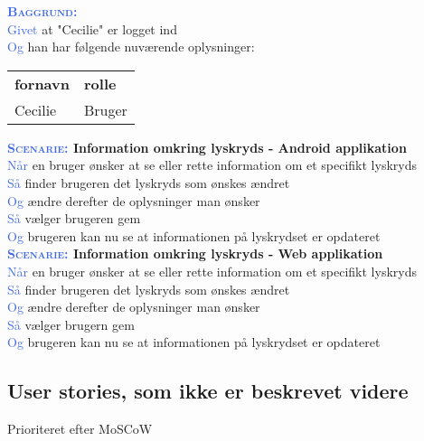 \textsc{\textcolor{RoyalBlue}{\textbf{Baggrund:}}}\\
\textcolor{RoyalBlue}{Givet} at "Cecilie" er logget ind\\
\textcolor{RoyalBlue}{Og} han har følgende nuværende oplysninger:\\
\begin{tabular}{| l | l |}
	\textbf{fornavn} & \textbf{rolle} \\
	Cecilie & Bruger\\
\end{tabular}
\newline \newline

\textbf{\textsc{\textcolor{RoyalBlue}{Scenarie:}} Information omkring lyskryds - Android applikation}\\
\textcolor{RoyalBlue}{Når} en bruger ønsker at se eller rette information om et specifikt lyskryds\\
\textcolor{RoyalBlue}{Så} finder brugeren det lyskryds som ønskes ændret\\
\textcolor{RoyalBlue}{Og} ændre derefter de oplysninger man ønsker\\
\textcolor{RoyalBlue}{Så} vælger brugeren gem\\
\textcolor{RoyalBlue}{Og} brugeren kan nu se at informationen på lyskrydset er opdateret\\

\textbf{\textsc{\textcolor{RoyalBlue}{Scenarie:}} Information omkring lyskryds - Web applikation}\\
\textcolor{RoyalBlue}{Når} en bruger ønsker at se eller rette information om et specifikt lyskryds\\
\textcolor{RoyalBlue}{Så} finder brugeren det lyskryds som ønskes ændret\\
\textcolor{RoyalBlue}{Og} ændre derefter de oplysninger man ønsker\\
\textcolor{RoyalBlue}{Så} vælger brugern gem\\
\textcolor{RoyalBlue}{Og} brugeren kan nu se at informationen på lyskrydset 
er opdateret\\


\subsection{User stories, som ikke er beskrevet videre}
Prioriteret efter MoSCoW

